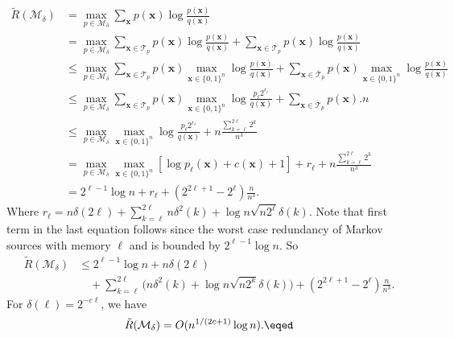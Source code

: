 \documentclass[conference,a4paper]{article}
\newcommand{\x}{\textbf{x}}
\newcommand{\M}{\mathcal{M}}
\begin{document}
\begin{align*}
\tilde{R}(\M_{\delta})
&=\max_{p\in\mathcal{M}_\delta}
\sum_\x p(\x)\log\frac{p(\x)}{q(\x)}\\
&=\max_{p\in\mathcal{M}_\delta}\sum_{\x\in\mathcal{T}_p}p(\x)\log\frac{p(\x)}{q(\x)}
	+\sum_{\x\in\bar{\mathcal{T}_p}}p(\x)\log\frac{p(\x)}{q(\x)}\\
&\leq
\max_{p\in\mathcal{M}_\delta} \sum_{\x\in\mathcal{T}_p}p(\x)\max_{\x\in\{0,1\}^n}\log\frac{p(\x)}{q(\x)}
	+\sum_{\x\in\bar{\mathcal{T}}_p}p(\x)\max_{\x\in\{0,1\}^n}\log\frac{p(\x)}{q(\x)}\\	
&\leq \max_{p\in\mathcal{M}_\delta}
\sum_{\x\in\mathcal{T}_p}p(\x)\max_{\x\in\{0,1\}^n}\log\frac{p_{\ell}2^{r_\ell}}{q(\x)}
	+\sum_{\x\in\bar{\mathcal{T}}_p}p(\x).n\\
&\leq \max_{p\in\mathcal{M}_\delta} \max_{\x\in\{0,1\}^n}	\log\frac{p_{\ell}2^{r_\ell}}{q(\x)}
	+n\frac{\sum_{k=\ell}^{2\ell}2^k}{n^3}\\
&= \max_{p\in\mathcal{M}_\delta} \max_{\x\in\{0,1\}^n}	[\log p_{\ell}(\x)+c(\x)+1]+r_\ell
	+n\frac{\sum_{k=\ell}^{2\ell}2^k}{n^3}\\	
&=2^{\ell-1}\log n+{r_\ell}
+(2^{2\ell+1}-2^\ell)\frac{n}{n^3}.
\end{align*}
Where $r_\ell=n\delta(2\ell)+\sum_{k=\ell}^{2\ell}n\delta^2(k)+\log n	\sqrt{n2^\ell}\delta(k)$. Note that first term in the last equation follows since the worst case redundancy of Markov sources with memory $\ell$ and is bounded by $2^{\ell-1}\log n$. So
\begin{align*}
\tilde{R}(\mathcal{M}_\delta)
&\leq 
	2^{\ell-1}\log n
+n\delta(2\ell)\\
&\quad+\sum_{k=\ell}^{2\ell}\big(n\delta^2(k)+\log n\sqrt{n2^k}\delta(k)\big)
	+(2^{2\ell+1}-2^\ell)\frac{n}{n^3}.
\end{align*} 
\eTheorem
\bCorollary
For $\delta(\ell)=2^{-c\ell}$, we have
$$\tilde{R}(\M_{\delta})=O(n^{1/(2c+1)}\log n).\eqed$$
\end{document}

